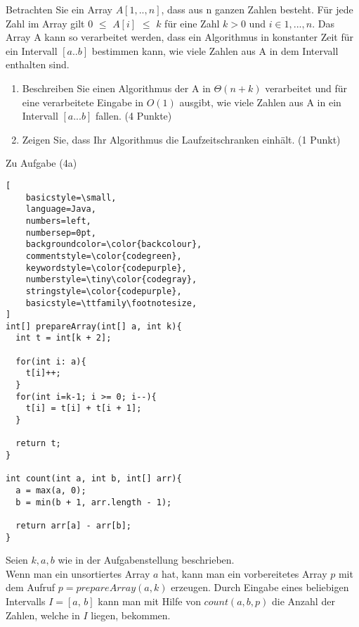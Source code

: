\documentclass[ngerman,landscape,twocolumn]{adtexsheet}
\begin{document}
\newpage
\begin{question}
Betrachten Sie ein Array $A[1,..,n]$, dass aus n ganzen Zahlen besteht. Für jede Zahl
im Array gilt 0 $\leq$ $A[i]$ $\leq$ $k$ für eine Zahl $k > 0$ und $i \in {1, ..., n}$. Das Array A kann so verarbeitet werden, dass ein Algorithmus in konstanter Zeit für ein Intervall $[a..b]$ bestimmen kann, wie viele Zahlen aus A in dem Intervall enthalten sind.
    \begin{enumerate}
        \item Beschreiben Sie einen Algorithmus der A in $\Theta(n + k)$ verarbeitet und für eine
        verarbeitete Eingabe in $O(1)$ ausgibt, wie viele Zahlen aus A in ein Intervall $[a...b]$
        fallen. (4 Punkte)
        \item Zeigen Sie, dass Ihr Algorithmus die Laufzeitschranken einhält. (1 Punkt)
    \end{enumerate}
\end{question}

Zu Aufgabe (4a)
\begin{lstlisting}[
    basicstyle=\small,
    language=Java,
    numbers=left,                    
    numbersep=0pt,
    backgroundcolor=\color{backcolour},   
    commentstyle=\color{codegreen},
    keywordstyle=\color{codepurple},
    numberstyle=\tiny\color{codegray},
    stringstyle=\color{codepurple},
    basicstyle=\ttfamily\footnotesize,
]
int[] prepareArray(int[] a, int k){
  int t = int[k + 2];

  for(int i: a){
    t[i]++;
  }
  for(int i=k-1; i >= 0; i--){
    t[i] = t[i] + t[i + 1];
  }

  return t;
}

int count(int a, int b, int[] arr){
  a = max(a, 0);
  b = min(b + 1, arr.length - 1);
    
  return arr[a] - arr[b];
}
\end{lstlisting}
Seien $k, a, b$ wie in der Aufgabenstellung beschrieben. \\
Wenn man ein unsortiertes Array $a$ hat, kann man ein vorbereitetes Array $p$ mit dem Aufruf $p = prepareArray(a,k)$  erzeugen. Durch Eingabe eines beliebigen Intervalls $I=[a,\,b]$ kann man mit Hilfe von $count(a, b, p)$ die Anzahl der Zahlen, welche in $I$ liegen, bekommen.
\end{document}
